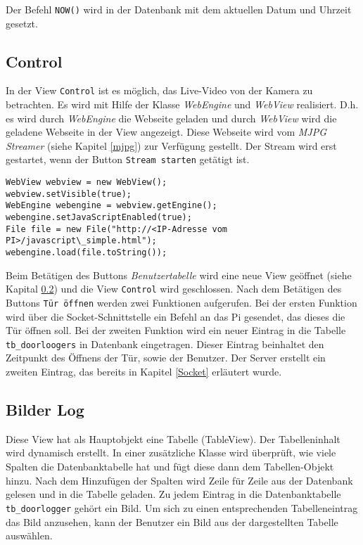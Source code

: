 Der Befehl \texttt{NOW()} wird in der Datenbank mit dem aktuellen Datum und Uhrzeit gesetzt.\\

\subsection{Control}
In der View \texttt{Control} ist es möglich, das Live-Video von der Kamera zu betrachten. Es wird mit Hilfe der Klasse \textit{WebEngine} und \textit{WebView} realisiert. D.h. es wird durch \textit{WebEngine} die Webseite geladen und durch \textit{WebView} wird die geladene Webseite in der View angezeigt. Diese Webseite wird vom \textit{MJPG Streamer} (siehe Kapitel \ref{mjpg}) zur Verfügung gestellt. Der Stream wird erst gestartet, wenn der Button \texttt{Stream starten} getätigt ist.

\begin{lstlisting}[caption={Stream Einbindung},captionpos=b]
WebView webview = new WebView();
webview.setVisible(true);
WebEngine webengine = webview.getEngine();
webengine.setJavaScriptEnabled(true);
File file = new File("http://<IP-Adresse vom PI>/javascript\_simple.html");
webengine.load(file.toString());
\end{lstlisting}

Beim Betätigen des Buttons \textit{Benutzertabelle} wird eine neue View geöffnet (siehe Kapital \ref{bilderLog}) und die View \texttt{Control} wird geschlossen. Nach dem Betätigen des Buttons \texttt{Tür öffnen} werden zwei Funktionen aufgerufen. Bei der ersten Funktion wird über die Socket-Schnittstelle ein Befehl an das Pi gesendet, das dieses die Tür öffnen soll. Bei der zweiten Funktion wird ein neuer Eintrag in die Tabelle \texttt{tb\_doorloogers} in Datenbank eingetragen. Dieser Eintrag beinhaltet den Zeitpunkt des Öffnens der Tür, sowie der Benutzer. Der Server erstellt ein zweiten Eintrag, das bereits in Kapitel \ref{Socket} erläutert wurde.\\


\subsection{Bilder Log}\label{bilderLog}
Diese View hat als Hauptobjekt eine Tabelle (TableView). Der Tabelleninhalt wird dynamisch erstellt. In einer zusätzliche Klasse wird überprüft, wie viele Spalten die Datenbanktabelle hat und fügt diese dann dem Tabellen-Objekt hinzu. Nach dem Hinzufügen der Spalten wird Zeile für Zeile aus der Datenbank gelesen und in die Tabelle geladen. Zu jedem Eintrag in die Datenbanktabelle \texttt{tb\_doorlogger} gehört ein Bild. Um sich zu einen entsprechenden Tabelleneintrag das Bild anzusehen, kann der Benutzer ein Bild aus der dargestellten Tabelle auswählen.\\







